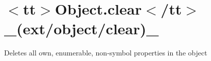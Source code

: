 \chapter{\texorpdfstring{$<$}{<}tt\texorpdfstring{$>$}{>}Object.\+clear\texorpdfstring{$<$}{<}/tt\texorpdfstring{$>$}{>} \+\_\+(ext/object/clear)\+\_\+}
\hypertarget{md__2home_2solype_2delivery_2current__days_2Mannheim_2front_2node__modules_2ext_2docs_2object_2clear}{}\label{md__2home_2solype_2delivery_2current__days_2Mannheim_2front_2node__modules_2ext_2docs_2object_2clear}
\label{md__2home_2solype_2delivery_2current__days_2Mannheim_2front_2node__modules_2ext_2docs_2object_2clear_autotoc_md2573}%
%
 Deletes all own, enumerable, non-\/symbol properties in the object


\begin{DoxyCode}{0}
\DoxyCodeLine{}
\DoxyCodeLine{}

\end{DoxyCode}
 